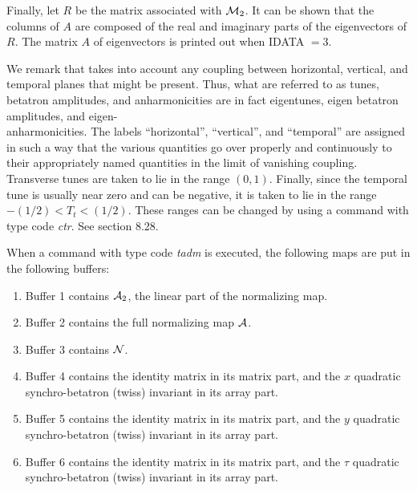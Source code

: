 Finally, let $R$ be the matrix associated with ${\cal M}_2$.  It can be shown that the columns of $A$ are composed of the real and imaginary parts of the eigenvectors of $R$.  The matrix $A$ of eigenvectors is printed out when IDATA $= 3$.

We remark that \Mary takes into account any coupling between
horizontal, vertical, and temporal planes that might be present.  Thus,
what are referred to as tunes, betatron amplitudes, and anharmonicities
are in fact eigentunes, eigen betatron amplitudes, and
eigen-\\
anharmonicities.  The labels ``horizontal'', ``vertical'', and
``temporal'' are assigned in such a way that the various quantities go
over properly and continuously to their appropriately named quantities in
the limit of vanishing coupling.  Transverse tunes are taken to lie in the range $(0,1)$.  Finally, since the temporal tune is
usually near zero and can be negative, it is taken to lie in the range
$-(1/2) < T_t < (1/2)$.  These ranges can be changed by  using a command with type code {\em ctr}.  See section 8.28.

When a command with type code {\em tadm }is executed, the following maps
are put in the following buffers:
\begin{enumerate}
           \item  Buffer 1 contains ${\cal A}_2$, the linear part of the normalizing
                  map.

           \item  Buffer 2 contains the full normalizing map ${\cal A}$.

		   \item  Buffer 3 contains ${\cal N}$.

           \item  Buffer 4 contains the identity matrix in its matrix part,
                  and the $x$ quadratic synchro-betatron (twiss) invariant in its
                  array part.

           \item  Buffer 5 contains the identity matrix in its matrix part,
                  and the $y$ quadratic synchro-betatron (twiss) invariant in its
                  array part.

           \item  Buffer 6 contains the identity matrix in its matrix part,
                  and the $\tau$ quadratic synchro-betatron (twiss) invariant in its
                  array part.
\end{enumerate}

